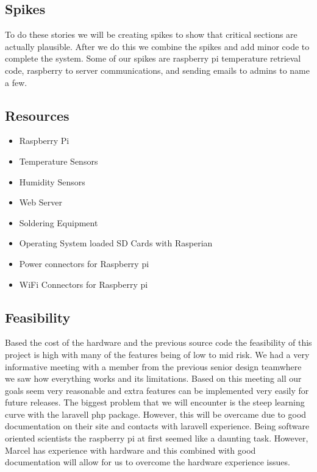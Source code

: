 \documentclass{report}
\begin{document}
\subsection*{Spikes}
	To do these stories we will be creating spikes to show that critical sections are actually plausible. After we do this we combine the spikes and add minor code to complete the system. Some of our spikes are raspberry pi temperature retrieval code, raspberry to server communications, and sending emails to admins to name a few. 
\newpage
\subsection*{Resources}
\begin{itemize}
\item Raspberry Pi
\item Temperature Sensors
\item Humidity Sensors
\item Web Server
\item Soldering Equipment
\item Operating System loaded SD Cards with Rasperian
\item Power connectors for Raspberry pi
\item WiFi Connectors for Raspberry pi
\end{itemize}
\newpage
\subsection*{Feasibility}
Based the cost of the hardware and the previous source code the feasibility of this project is high with many of the features being of low to mid risk. 
We had a very informative meeting with a member from the previous senior design teamwhere we saw how everything works and its limitations.
Based on this meeting all our goals seem very reasonable and extra features can be implemented very easily for future releases.
The biggest problem that we will encounter is the steep learning curve with the laravell php package.
However, this will be overcame due to good documentation on their site and contacts with laravell experience.
Being software oriented scientists the raspberry pi at first seemed like a daunting task. 
However, Marcel has experience with hardware and this combined with good documentation will allow for us to overcome the hardware experience issues.
\newpage
\end{document}
